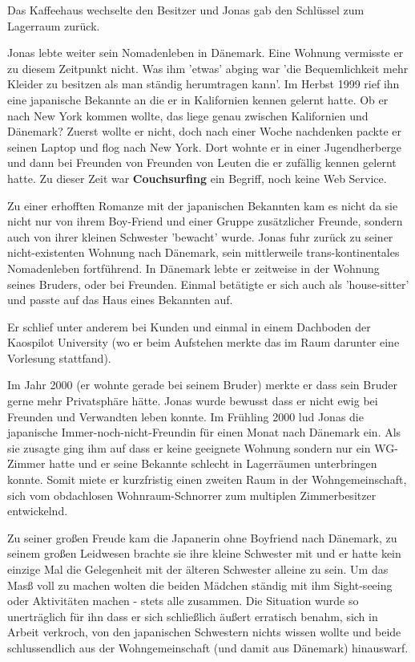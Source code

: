 \documentclass[10pt,a4paper,ngerman,twoside]{article} %
\begin{document}
Das Kaffeehaus wechselte den Besitzer und Jonas gab den Schlüssel zum Lagerraum zurück. 

Jonas lebte weiter sein Nomadenleben in Dänemark. Eine Wohnung vermisste er zu diesem Zeitpunkt nicht. Was ihm 'etwas' abging war 'die Bequemlichkeit mehr Kleider zu besitzen als man ständig herumtragen kann'. Im Herbst 1999 rief ihn eine japanische Bekannte an die er in Kalifornien kennen gelernt hatte. Ob er nach New York kommen wollte, das liege genau zwischen Kalifornien und Dänemark? Zuerst wollte er nicht, doch nach einer Woche nachdenken packte er seinen Laptop und flog nach New York. Dort wohnte er in einer Jugendherberge und dann bei Freunden von Freunden von Leuten die er zufällig kennen gelernt hatte. Zu dieser Zeit war \textbf{Couchsurfing} ein Begriff, noch keine Web Service.

Zu einer erhofften Romanze mit der japanischen Bekannten kam es nicht da sie nicht nur von ihrem Boy-Friend und einer Gruppe zusätzlicher Freunde, sondern auch von ihrer kleinen Schwester 'bewacht' wurde. Jonas fuhr zurück zu seiner nicht-existenten Wohnung nach Dänemark, sein mittlerweile trans-kontinentales Nomadenleben fortführend. In Dänemark lebte er zeitweise in der Wohnung seines Bruders, oder bei Freunden. Einmal betätigte er sich auch als 'house-sitter' und passte auf das Haus eines Bekannten auf. 

Er schlief unter anderem bei Kunden und einmal in einem Dachboden der Kaospilot University (wo er beim Aufstehen merkte das im Raum darunter eine Vorlesung stattfand).


Im Jahr 2000 (er wohnte gerade bei seinem Bruder) merkte er dass sein Bruder gerne mehr Privatsphäre hätte. Jonas wurde bewusst dass er nicht ewig bei Freunden und Verwandten leben konnte. Im Frühling 2000 lud Jonas die japanische Immer-noch-nicht-Freundin für einen Monat nach Dänemark ein. Als sie zusagte ging ihm auf dass er keine geeignete Wohnung sondern nur ein WG-Zimmer hatte und er seine Bekannte schlecht in Lagerräumen unterbringen konnte. Somit miete er kurzfristig einen zweiten Raum in der Wohngemeinschaft, sich vom obdachlosen Wohnraum-Schnorrer zum multiplen Zimmerbesitzer entwickelnd.

Zu seiner großen Freude kam die Japanerin ohne Boyfriend nach Dänemark, zu seinem großen Leidwesen brachte sie ihre kleine Schwester mit und er hatte kein einzige Mal die Gelegenheit mit der älteren Schwester alleine zu sein. Um das Masß voll zu machen wolten die beiden Mädchen ständig mit ihm Sight-seeing oder Aktivitäten machen  - stets alle zusammen. Die Situation wurde so unerträglich für ihn dass er sich schließlich äußert erratisch benahm, sich in Arbeit verkroch, von den japanischen Schwestern nichts wissen wollte und beide schlussendlich aus der Wohngemeinschaft (und damit aus Dänemark) hinauswarf.
\end{document}
